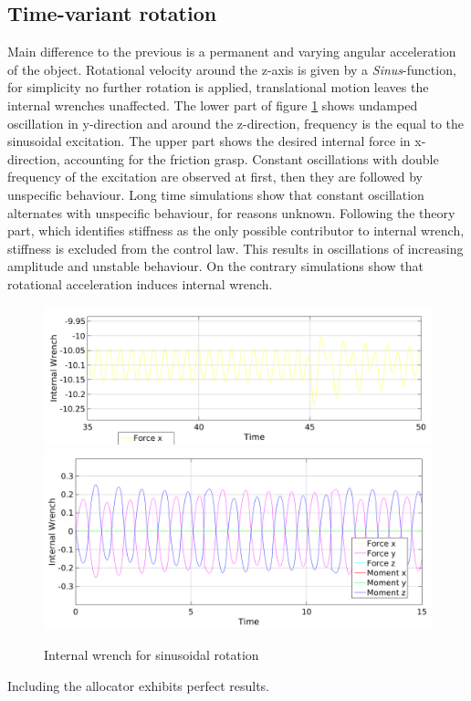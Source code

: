 \documentclass[conference]{IEEEtran}
\begin{document}
\subsection{Time-variant rotation} 
Main difference to the previous is a permanent and varying angular acceleration of the object. Rotational velocity around the z-axis is given by a \textit{Sinus}-function, for simplicity no further rotation is applied, translational motion leaves the internal wrenches unaffected. The lower part of figure \ref{IntForceSinus} shows undamped oscillation in y-direction and around the z-direction, frequency is the equal to the sinusoidal excitation. The upper part shows the desired internal force in x-direction, accounting for the friction grasp. Constant oscillations with double frequency of the excitation are observed at first, then they are followed by unspecific behaviour. Long time simulations show that constant oscillation alternates with unspecific behaviour, for reasons unknown. Following the theory part, which identifies stiffness as the only possible contributor to internal wrench, stiffness is excluded from the control law. This results in oscillations of increasing amplitude and unstable behaviour. On the contrary simulations show that rotational acceleration induces internal wrench.  
\begin{figure}
\includegraphics[width=\linewidth]{IntForceSinus2}
\includegraphics[width=\linewidth]{IntForceSinus1}
\caption{Internal wrench for sinusoidal rotation}
\label{IntForceSinus}
\end{figure} 
Including the allocator exhibits perfect results.
\end{document}
